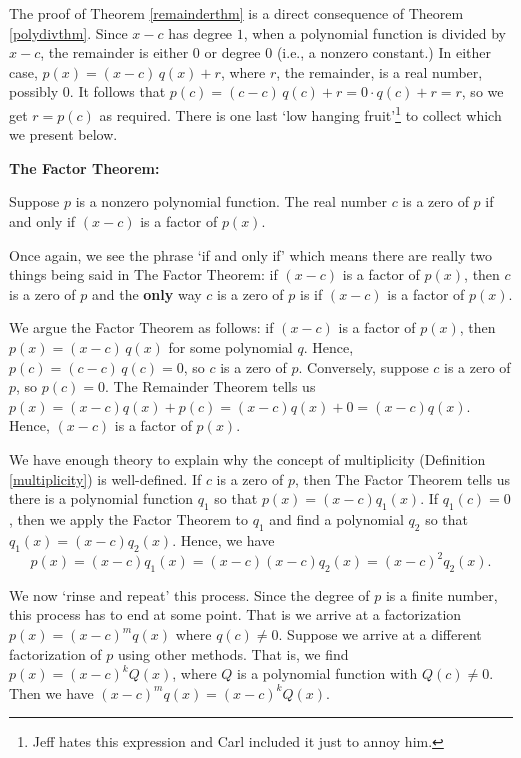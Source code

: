 \documentclass{ximera}
\begin{document}
The proof of Theorem \ref{remainderthm} is a direct consequence of Theorem \ref{polydivthm}.  Since  $x-c$ has degree $1$, when a polynomial function is divided by $x-c$, the remainder is either $0$ or degree $0$ (i.e., a nonzero constant.)   In either case, $p(x) = (x-c) \, q(x) + r$, where $r$, the remainder, is a real number, possibly $0$.  It follows that $p(c) = (c-c) \, q(c) + r = 0 \cdot q(c) + r = r$, so we get $r = p(c)$ as required.  There is one last `low hanging fruit'\footnote{Jeff hates this expression and Carl included it just to annoy him.} to collect which we present below.

 


\begin{theorem} \label{factorthm}\textbf{The Factor Theorem:}  

Suppose $p$ is a nonzero polynomial function.  The real number $c$ is a zero of $p$ if and only if $(x-c)$ is a factor of $p(x)$.  

\end{theorem}

 

Once again, we see the phrase `if and only if' which means there are really two things being said in  The Factor Theorem:  if $(x-c)$ is a factor of $p(x)$, then $c$ is a zero of $p$ and the \textbf{only} way $c$ is a zero  of $p$ is if $(x-c)$ is a factor of $p(x)$.  

 

We argue the Factor Theorem as follows:   if $(x-c)$ is a factor of $p(x)$, then $p(x) = (x-c) \, q(x)$ for some polynomial $q$.  Hence, $p(c) = (c-c) \, q(c) = 0$, so $c$ is a zero of $p$.  Conversely, suppose $c$ is a zero of $p$, so $p(c) = 0$.   The Remainder Theorem tells us $p(x) = (x-c)q(x) + p(c) = (x-c)q(x) + 0 = (x-c)q(x)$.   Hence, $(x-c)$ is a factor of $p(x)$. 

 

We have enough theory to explain why the concept of multiplicity (Definition \ref{multiplicity}) is well-defined. If $c$ is a zero of $p$, then The Factor Theorem tells us there is a polynomial function $q_1$ so that $p(x) = (x-c)q_1(x)$.  If $q_1(c) = 0$, then we apply the Factor Theorem to $q_1$ and find a  polynomial $q_2$ so that $q_1(x)  = (x-c) q_2(x)$.    Hence, we have  \[p(x) = (x-c) q_1(x) = (x-c) (x-c) q_2(x) = (x-c)^2 q_2(x).\]

 

We now `rinse and repeat' this process.  Since the degree of $p$ is a finite number, this process has to end at some point.  That is we arrive at a factorization  $p(x) = (x-c)^m q(x)$ where $q(c) \neq 0$.  Suppose we arrive at a different factorization of $p$ using other methods.  That is, we find $p(x) = (x-c)^k Q(x)$, where $Q$ is a polynomial function with $Q(c) \neq 0$.   Then we have $(x-c)^m q(x) = (x-c)^k Q(x)$.    
\end{document}
